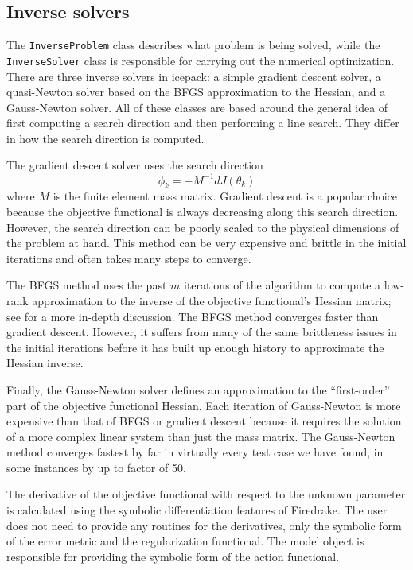 \documentclass[journal abbreviation, manuscript]{copernicus}
\begin{document}
\subsection{Inverse solvers} \label{sec:numerics-inverse-solvers}

The \texttt{InverseProblem} class describes what problem is being solved, while the \texttt{InverseSolver} class is responsible for carrying out the numerical optimization.
There are three inverse solvers in icepack: a simple gradient descent solver, a quasi-Newton solver based on the BFGS approximation to the Hessian, and a Gauss-Newton solver.
All of these classes are based around the general idea of first computing a search direction and then performing a line search.
They differ in how the search direction is computed.

The gradient descent solver uses the search direction
\begin{equation}
    \phi_k = -M^{-1}dJ(\theta_k)
\end{equation}
where $M$ is the finite element mass matrix.
Gradient descent is a popular choice because the objective functional is always decreasing along this search direction.
However, the search direction can be poorly scaled to the physical dimensions of the problem at hand.
This method can be very expensive and brittle in the initial iterations and often takes many steps to converge.

The BFGS method uses the past $m$ iterations of the algorithm to compute a low-rank approximation to the inverse of the objective functional's Hessian matrix; see \citet{nocedal2006numerical} for a more in-depth discussion.
The BFGS method converges faster than gradient descent.
However, it suffers from many of the same brittleness issues in the initial iterations before it has built up enough history to approximate the Hessian inverse.

Finally, the Gauss-Newton solver defines an approximation to the ``first-order'' part of the objective functional Hessian.
Each iteration of Gauss-Newton is more expensive than that of BFGS or gradient descent because it requires the solution of a more complex linear system than just the mass matrix.
The Gauss-Newton method converges fastest by far in virtually every test case we have found, in some instances by up to factor of 50.

The derivative of the objective functional with respect to the unknown parameter is calculated using the symbolic differentiation features of Firedrake.
The user does not need to provide any routines for the derivatives, only the symbolic form of the error metric and the regularization functional.
The model object is responsible for providing the symbolic form of the action functional.
\end{document}
